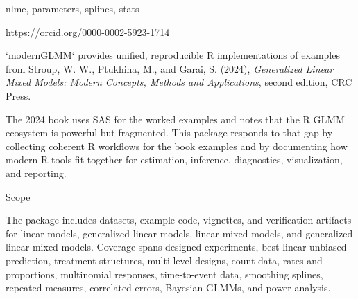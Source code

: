 \documentclass[a4paper]{book}
\begin{document}
\begin{description}
{nlme, parameters, splines, stats}
\item[Suggests]
\item[Config/testthat/edition]
\item[RoxygenNote]
\item[VignetteBuilder]
\item[NeedsCompilation]
\item[Author]\url{https://orcid.org/0000-0002-5923-1714}
\end{description}
%
\begin{Description}
`modernGLMM` provides unified, reproducible R implementations of examples
from Stroup, W. W., Ptukhina, M., and Garai, S. (2024),
\emph{Generalized Linear Mixed Models: Modern Concepts, Methods and
Applications}, second edition, CRC Press.

The 2024 book uses SAS for the worked examples and notes that the R GLMM
ecosystem is powerful but fragmented. This package responds to that gap by
collecting coherent R workflows for the book examples and by documenting how
modern R tools fit together for estimation, inference, diagnostics,
visualization, and reporting.
\end{Description}
%
\begin{Section}{Scope}

The package includes datasets, example code, vignettes, and verification
artifacts for linear models, generalized linear models, linear mixed models,
and generalized linear mixed models. Coverage spans designed experiments,
best linear unbiased prediction, treatment structures, multi-level designs,
count data, rates and proportions, multinomial responses, time-to-event data,
smoothing splines, repeated measures, correlated errors, Bayesian GLMMs, and
power analysis.
\end{Section}
%
\end{document}

